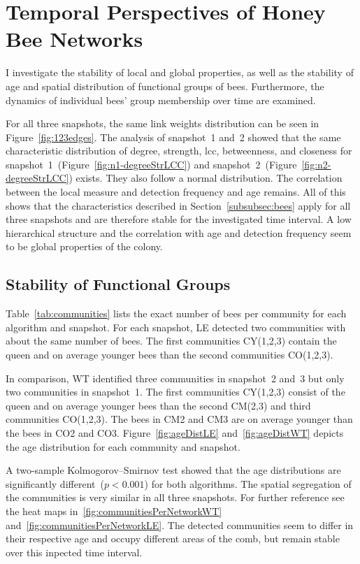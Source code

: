 \section{Temporal Perspectives of Honey Bee Networks}
\label{sec:temporalresults}
I investigate the stability of local and global properties, as well as the stability of age and spatial distribution of functional groups of bees.
Furthermore, the dynamics of individual bees' group membership over time are examined.

For all three snapshots, the same link weights distribution can be seen in Figure~\ref{fig:123edges}.
The analysis of snapshot~1 and~2 showed that the same characteristic distribution of degree, strength, lcc, betweenness, and closeness for snapshot~1~(Figure~\ref{fig:n1-degreeStrLCC}) and snapshot~2~(Figure~\ref{fig:n2-degreeStrLCC}) exists. They also follow a normal distribution. The correlation between the local measure and detection frequency and age remains.
All of this shows that the characteristics described in Section~\ref{subsubsec:bees} apply for all three snapshots and are therefore stable for the investigated time interval. A low hierarchical structure and the correlation with age and detection frequency seem to be global properties of the colony.

\subsection{Stability of Functional Groups}
Table~\ref{tab:communities} lists the exact number of bees per community for each algorithm and snapshot.
For each snapshot, LE detected two communities with about the same number of bees.
The first communities CY(1,2,3) contain the queen and on average younger bees than the second communities CO(1,2,3).

In comparison, WT identified three communities in snapshot~2 and~3 but only two communities in snapshot~1.
The first communities CY(1,2,3) consist of the queen and on average younger bees than the second CM(2,3) and third communities CO(1,2,3).
The bees in CM2 and CM3 are on average younger than the bees in CO2 and CO3.
Figure~\ref{fig:ageDistLE} and~\ref{fig:ageDistWT} depicts the age distribution for each community and snapshot.

A two-sample Kolmogorov–Smirnov test showed that the age distributions are significantly different~($p< 0.001$) for both algorithms.
The spatial segregation of the communities is very similar in all three snapshots. For further reference see the heat maps in~\ref{fig:communitiesPerNetworkWT} and~\ref{fig:communitiesPerNetworkLE}.
The detected communities seem to differ in their respective age and occupy different areas of the comb, but remain stable over this inpected time interval.

